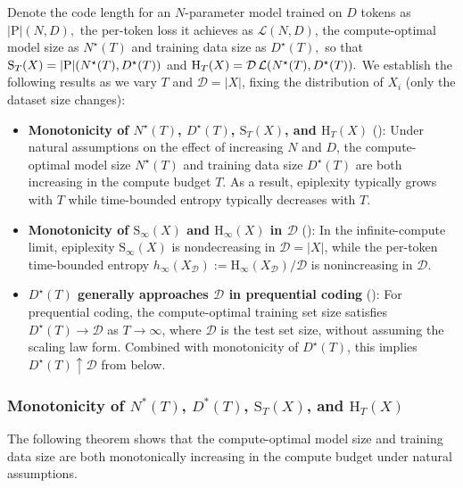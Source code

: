 \documentclass[twoside]{article}
\renewcommand{\L}{\mathcal{L}}
\newcommand{\D}{\mathcal{D}}
\newcommand{\rH}{\mathrm{H}}
\newcommand{\rS}{\mathrm{S}}
\renewcommand{\L}{\mathcal{L}}
\begin{document}
Denote the code length for an $N$-parameter model trained on $D$ tokens as $|\mathrm{P}|(N,D),$ the per-token loss it achieves as $\L(N,D)$, the compute-optimal model size as $N^\star(T)$ and training data size as $D^\star(T),$ so that $\rS_T(X) = |\mathrm{P}|\qty(N^\star(T), D^\star(T))$ and $\rH_T(X) = \D\, \L\qty(N^\star(T), D^\star(T)).$ We establish the following results as we vary $T$ and $\D = |X|$, fixing the distribution of $X_i$ (only the dataset size changes):
\begin{itemize}
    \item \textbf{Monotonicity of $N^\star(T)$, $D^\star(T)$, $\rS_T(X)$, and $\rH_T(X)$} (): Under natural assumptions on the effect of increasing $N$ and $D$, the compute-optimal model size $N^\star(T)$ and training data size $D^\star(T)$ are both increasing in the compute budget $T$. As a result, epiplexity typically grows with $T$ while time-bounded entropy typically decreases with $T$.

    \item \textbf{Monotonicity of $\rS_\infty(X)$ and $\rH_\infty(X)$ in $\D$} (): In the infinite-compute limit, epiplexity $\rS_\infty(X)$ is nondecreasing in $\D = |X|$, while the per-token time-bounded entropy $h_\infty(X_\D) := \rH_\infty(X_\D) / \D$ is nonincreasing in $\D$.

    \item \textbf{$D^\star(T)$ generally approaches $\D$ in prequential coding} (): For prequential coding, the compute-optimal training set size satisfies $D^\star(T) \to \D$ as $T \to \infty$, where $\D$ is the test set size, without assuming the scaling law form. Combined with monotonicity of $D^\star(T)$, this implies $D^\star(T) \uparrow \D$ from below.
\end{itemize}


\subsubsection{Monotonicity of $N^*(T)$, $D^*(T)$, $\rS_T(X)$, and $\rH_T(X)$}
\label{app:monotonicity-in-T}

The following theorem shows that the compute-optimal model size and training data size are both monotonically increasing in the compute budget under natural assumptions.
\end{document}
